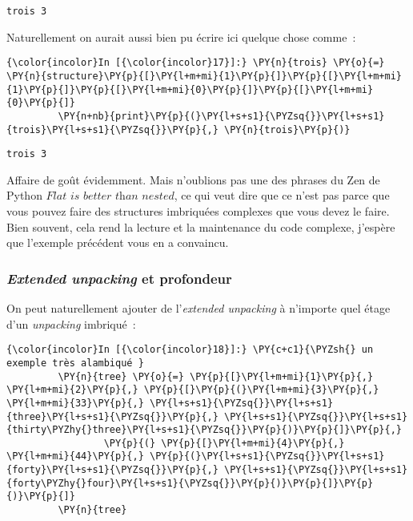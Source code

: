     \begin{Verbatim}[commandchars=\\\{\}]
trois 3

    \end{Verbatim}

    Naturellement on aurait aussi bien pu écrire ici quelque chose comme~:

    \begin{Verbatim}[commandchars=\\\{\}]
{\color{incolor}In [{\color{incolor}17}]:} \PY{n}{trois} \PY{o}{=} \PY{n}{structure}\PY{p}{[}\PY{l+m+mi}{1}\PY{p}{]}\PY{p}{[}\PY{l+m+mi}{1}\PY{p}{]}\PY{p}{[}\PY{l+m+mi}{0}\PY{p}{]}\PY{p}{[}\PY{l+m+mi}{0}\PY{p}{]}
         \PY{n+nb}{print}\PY{p}{(}\PY{l+s+s1}{\PYZsq{}}\PY{l+s+s1}{trois}\PY{l+s+s1}{\PYZsq{}}\PY{p}{,} \PY{n}{trois}\PY{p}{)}
\end{Verbatim}


    \begin{Verbatim}[commandchars=\\\{\}]
trois 3

    \end{Verbatim}

    Affaire de goût évidemment. Mais n'oublions pas une des phrases du Zen
de Python \(\textit{Flat is better than nested}\), ce qui veut dire que
ce n'est pas parce que vous pouvez faire des structures imbriquées
complexes que vous devez le faire. Bien souvent, cela rend la lecture et
la maintenance du code complexe, j'espère que l'exemple précédent vous
en a convaincu.

    \hypertarget{extended-unpacking-et-profondeur}{%
\subsubsection{\texorpdfstring{\emph{Extended unpacking} et
profondeur}{Extended unpacking et profondeur}}\label{extended-unpacking-et-profondeur}}

    On peut naturellement ajouter de l'\emph{extended unpacking} à n'importe
quel étage d'un \emph{unpacking} imbriqué~:

    \begin{Verbatim}[commandchars=\\\{\}]
{\color{incolor}In [{\color{incolor}18}]:} \PY{c+c1}{\PYZsh{} un exemple très alambiqué }
         \PY{n}{tree} \PY{o}{=} \PY{p}{[}\PY{l+m+mi}{1}\PY{p}{,} \PY{l+m+mi}{2}\PY{p}{,} \PY{p}{[}\PY{p}{(}\PY{l+m+mi}{3}\PY{p}{,} \PY{l+m+mi}{33}\PY{p}{,} \PY{l+s+s1}{\PYZsq{}}\PY{l+s+s1}{three}\PY{l+s+s1}{\PYZsq{}}\PY{p}{,} \PY{l+s+s1}{\PYZsq{}}\PY{l+s+s1}{thirty\PYZhy{}three}\PY{l+s+s1}{\PYZsq{}}\PY{p}{)}\PY{p}{]}\PY{p}{,}
                 \PY{p}{(} \PY{p}{[}\PY{l+m+mi}{4}\PY{p}{,} \PY{l+m+mi}{44}\PY{p}{,} \PY{p}{(}\PY{l+s+s1}{\PYZsq{}}\PY{l+s+s1}{forty}\PY{l+s+s1}{\PYZsq{}}\PY{p}{,} \PY{l+s+s1}{\PYZsq{}}\PY{l+s+s1}{forty\PYZhy{}four}\PY{l+s+s1}{\PYZsq{}}\PY{p}{)}\PY{p}{]}\PY{p}{)}\PY{p}{]}
         \PY{n}{tree}
\end{Verbatim}


